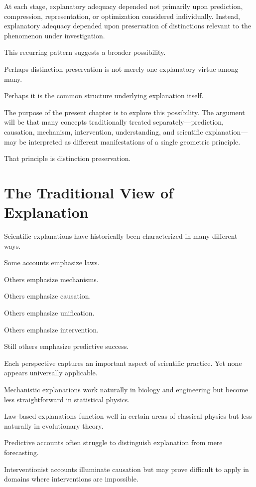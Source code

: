 \documentclass[11pt,oneside,openany]{book}
\begin{document}
At each stage, explanatory adequacy depended not primarily upon prediction, compression, representation, or optimization considered individually. Instead, explanatory adequacy depended upon preservation of distinctions relevant to the phenomenon under investigation.

This recurring pattern suggests a broader possibility.

Perhaps distinction preservation is not merely one explanatory virtue among many.

Perhaps it is the common structure underlying explanation itself.

The purpose of the present chapter is to explore this possibility. The argument will be that many concepts traditionally treated separately—prediction, causation, mechanism, intervention, understanding, and scientific explanation—may be interpreted as different manifestations of a single geometric principle.

That principle is distinction preservation.

\section{The Traditional View of Explanation}

Scientific explanations have historically been characterized in many different ways.

Some accounts emphasize laws.

Others emphasize mechanisms.

Others emphasize causation.

Others emphasize unification.

Others emphasize intervention.

Still others emphasize predictive success.

Each perspective captures an important aspect of scientific practice. Yet none appears universally applicable.

Mechanistic explanations work naturally in biology and engineering but become less straightforward in statistical physics.

Law-based explanations function well in certain areas of classical physics but less naturally in evolutionary theory.

Predictive accounts often struggle to distinguish explanation from mere forecasting.

Interventionist accounts illuminate causation but may prove difficult to apply in domains where interventions are impossible.
\end{document}
